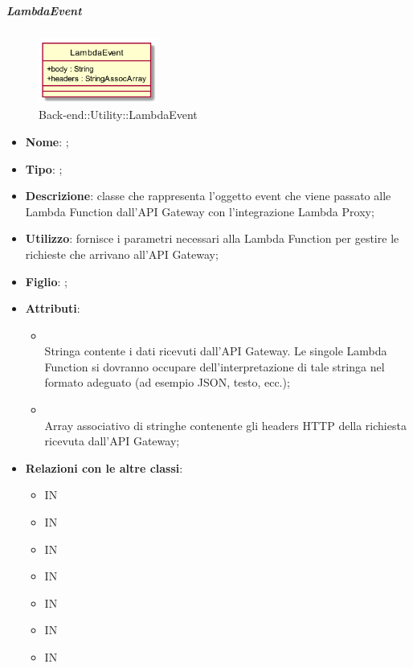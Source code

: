 \hypertarget{LambdaEvent_label}{\subparagraph{LambdaEvent}}
\begin{figure}[h]
	\centering
	\includegraphics[width=0.35\textwidth,height=\textheight,keepaspectratio]{images/ClassLambdaEvent.png}
	\caption{Back-end::Utility::LambdaEvent}
\end{figure}
\begin{itemize}
	\item \textbf{Nome}: ;
	\item \textbf{Tipo}: ;
	\item \textbf{Descrizione}: classe che rappresenta l'oggetto event che viene passato alle Lambda Function dall'API Gateway con l'integrazione Lambda Proxy;
	\item \textbf{Utilizzo}: fornisce i parametri necessari alla Lambda Function per gestire le richieste che arrivano all'API Gateway;
	\item \textbf{Figlio}: ;
	\item \textbf{Attributi}:
	\begin{itemize}
		\item[]  \\
		Stringa contente i dati ricevuti dall'API Gateway. Le singole Lambda  Function si dovranno occupare dell'interpretazione di tale stringa nel formato adeguato (ad esempio JSON, testo, ecc.);
		\item[]  \\
		Array associativo di stringhe contenente gli headers HTTP della richiesta ricevuta dall'API Gateway;
	\end{itemize}
	\item \textbf{Relazioni con le altre classi}:
	\begin{itemize}
		\item IN \hyperlink{AdministrationWebhookService_label}{}
		\item IN \hyperlink{ConversationWebhookService_label}{}
		\item IN \hyperlink{NotificationService_label}{}
		\item IN \hyperlink{RulesService_label}{}
		\item IN \hyperlink{UsersService_label}{}
		\item IN \hyperlink{VAService_label}{}
		\item IN \hyperlink{VocalAPI_label}{}
	\end{itemize}
\end{itemize}
\FloatBarrier

